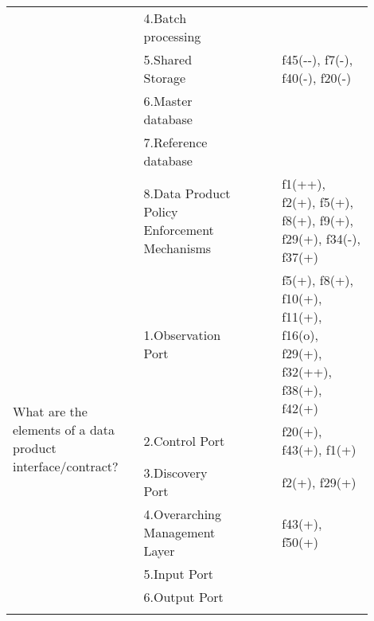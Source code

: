 \begin{tabular}{|p{0.12\linewidth}|p{0.015\linewidth}|p{0.3\linewidth}|p{0.15\linewidth}|p{0.31\linewidth}|}
 & \cellcolor{emerald_shape_7}{} & 4.Batch processing&\cellcolor{emerald_shape_1}{} & \\
 & \cellcolor{emerald_shape_7}{} & 5.Shared Storage&\cellcolor{emerald_shape_1}{s33, i3} & f45(-{}-), f7(-), f40(-), f20(-)\\
 & \cellcolor{emerald_shape_7}{} & 6.Master database&\cellcolor{emerald_shape_1}{} & \\
 & \cellcolor{emerald_shape_7}{} & 7.Reference database&\cellcolor{emerald_shape_1}{} & \\
 & \multirow{-8}{\linewidth}{ \cellcolor{emerald_shape_7}{55}} &8.Data Product Policy Enforcement Mechanisms&\cellcolor{emerald_shape_5}{s1, s3, s4, s5, s6, s12, s15, s20, s23, s27, s31, s32, s36, s38, s39, s40, s43, s47, s52, s56, i5} & f1(++), f2(+), f5(+), f8(+), f9(+), f29(+), f34(-), f37(+)\\
\multirow{6}{\linewidth}{What are the elements of a data product interface/contract?} &\cellcolor{emerald_shape_4}{} &1.Observation Port&\cellcolor{emerald_shape_6}{s3, s7, s11, s13, s22, s52, i2, i3, i4, i6} & f5(+), f8(+), f10(+), f11(+), f16(o), f29(+), f32(++), f38(+), f42(+)\\
 & \cellcolor{emerald_shape_4}{} & 2.Control Port&\cellcolor{emerald_shape_5}{s49, s52, i1, i2, i4, i6} & f20(+), f43(+), f1(+)\\
 & \cellcolor{emerald_shape_4}{} & 3.Discovery Port&\cellcolor{emerald_shape_5}{s20, s25, s49, s52, i3, i4} & f2(+), f29(+)\\
 & \cellcolor{emerald_shape_4}{} & 4.Overarching Management Layer&\cellcolor{emerald_shape_4}{i1, i2, i6} & f43(+), f50(+)\\
 & \cellcolor{emerald_shape_4}{} & 5.Input Port&\cellcolor{emerald_shape_2}{i4} & \\
 & \multirow{-6}{\linewidth}{ \cellcolor{emerald_shape_4}{15}} &6.Output Port&\cellcolor{emerald_shape_2}{i4} & \\
\hline
\multicolumn{5}{l}{\parbox{\textwidth}{\smallskip
}}
\end{tabular}
